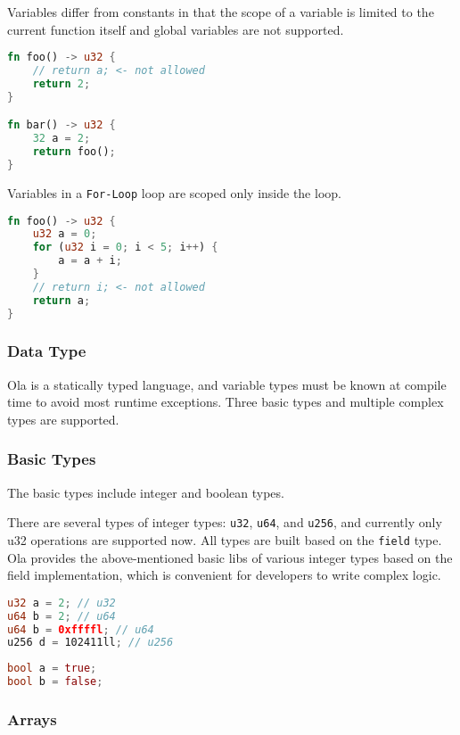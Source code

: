 Variables differ from constants in that the scope of a variable is limited to the current function itself and global variables are not supported.

\begin{lstlisting}[language=rust]
fn foo() -> u32 {
    // return a; <- not allowed
    return 2;
}

fn bar() -> u32 {
    32 a = 2;
    return foo();
}
\end{lstlisting}

Variables in a \texttt{For-Loop} loop are scoped only inside the loop.

\begin{lstlisting}[language=rust]
fn foo() -> u32 {
    u32 a = 0;
    for (u32 i = 0; i < 5; i++) {
        a = a + i;
    }
    // return i; <- not allowed
    return a;
}
\end{lstlisting}

\subsubsection{Data Type}

Ola is a statically typed language, and variable types must be known at compile time to avoid most runtime exceptions. 
Three basic types and multiple complex types are supported.

\subsubsection*{Basic Types}

The basic types include integer and boolean types.

There are several types of integer types: \texttt{u32}, \texttt{u64}, and \texttt{u256}, and currently only u32 operations are supported now. 
All types are built based on the \texttt{field} type.
Ola provides the above-mentioned basic libs of various integer types based on the field implementation, which is convenient for developers to write complex logic.

\begin{lstlisting}[language=rust]
u32 a = 2; // u32
u64 b = 2; // u64
u64 b = 0xffffl; // u64
u256 d = 102411ll; // u256
\end{lstlisting}

\begin{lstlisting}[language=rust]
bool a = true;
bool b = false;
\end{lstlisting}
\subsubsection*{Arrays}

